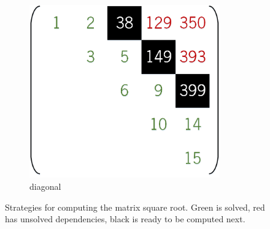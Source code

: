 \documentclass[../thesis]{subfiles}
\begin{document}
\begin{figure}[htp]
\begin{subfigure}{0.3\textwidth}
			\centering
			\includegraphics[width=0.9\textwidth]{assets/images/case/diagonal.png}
			\caption{diagonal}
		\end{subfigure}
		\caption[Strategies for computing the matrix square root]{Strategies for computing the matrix square root. Green is solved, red has unsolved dependencies, black is ready to be computed next.}
	\end{figure}
\end{document}
